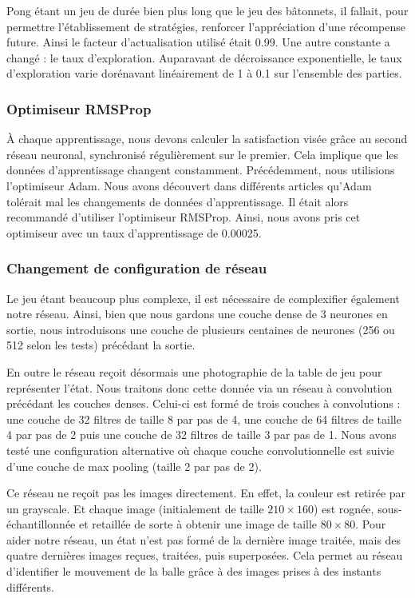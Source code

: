 Pong étant un jeu de durée bien plus long que le jeu des bâtonnets, il fallait, pour permettre l'établissement de stratégies, renforcer l'appréciation d'une
récompense future. Ainsi le facteur d'actualisation utilisé était 0.99. Une autre constante a changé : le taux d'exploration. Auparavant de décroissance exponentielle,
le taux d'exploration varie dorénavant linéairement de 1 à 0.1 sur l'ensemble des parties.

\subsubsection{Optimiseur RMSProp}

À chaque apprentissage, nous devons calculer la satisfaction visée grâce au second réseau neuronal, synchronisé régulièrement sur le premier. Cela implique
que les données d'apprentissage changent constamment. Précédemment, nous utilisions l'optimiseur Adam. Nous avons découvert dans différents articles qu'Adam tolérait
mal les changements de données d'apprentissage. Il était alors recommandé d'utiliser l'optimiseur RMSProp. Ainsi, nous avons pris cet optimiseur avec un 
taux d'apprentissage de 0.00025.

\subsubsection{Changement de configuration de réseau}

Le jeu étant beaucoup plus complexe, il est nécessaire de complexifier également notre réseau. Ainsi, bien que nous gardons une couche dense de 3 neurones en sortie,
nous introduisons une couche de plusieurs centaines de neurones (256 ou 512 selon les tests) précédant la sortie. 

En outre le réseau reçoit désormais une photographie de la table de jeu pour représenter l'état. Nous traitons donc cette donnée via un réseau à convolution précédant
les couches denses. Celui-ci est formé de trois couches à convolutions : une couche de 32 filtres de taille 8 par pas de 4, une couche de 64 filtres de taille 4 par pas
de 2 puis une couche de 32 filtres de taille 3 par pas de 1. Nous avons testé une configuration alternative où chaque couche convolutionnelle est suivie d'une
couche de max pooling (taille 2 par pas de 2).

Ce réseau ne reçoit pas les images directement. En effet, la couleur est retirée par un grayscale. Et chaque image (initialement de taille $210 \times 160$) est rognée,
sous-échantillonnée et retaillée de sorte à obtenir une image de taille $80 \times 80$. Pour aider notre réseau, un état n'est pas formé de la dernière image traitée, mais
des quatre dernières images reçues, traitées, puis superposées. Cela permet au réseau d'identifier le mouvement de la balle grâce à des images prises à des instants
différents.

